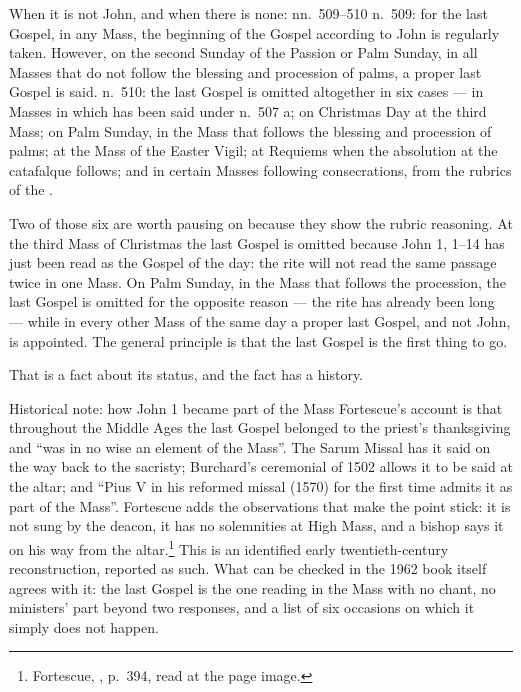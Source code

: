 \begin{rubricnote}{When it is not John, and when there is none: nn.~509--510}
n.~509: for the last Gospel, in any Mass, the beginning of the Gospel according
to John is regularly taken. However, on the second Sunday of the Passion or
Palm Sunday, in all Masses that do not follow the blessing and procession of
palms, a proper last Gospel is said. n.~510: the last Gospel is omitted
altogether in six cases --- in Masses in which 
has been said under n.~507 a; on Christmas Day at the third Mass; on Palm
Sunday, in the Mass that follows the blessing and procession of palms; at the
Mass of the Easter Vigil; at Requiems when the absolution at the catafalque
follows; and in certain Masses following consecrations, from the rubrics of the
.
\end{rubricnote}

Two of those six are worth pausing on because they show the rubric reasoning.
At the third Mass of Christmas the last Gospel is omitted because John 1,
1--14 has just been read as the Gospel of the day: the rite will not read the
same passage twice in one Mass. On Palm Sunday, in the Mass that follows the
procession, the last Gospel is omitted for the opposite reason --- the rite has
already been long --- while in every other Mass of the same day a proper last
Gospel, and not John, is appointed. The general principle is that the last
Gospel is the first thing to go.

That is a fact about its status, and the fact has a history.

\begin{witnesscard}{Historical note: how John 1 became part of the Mass}
Fortescue's account is that throughout the Middle Ages the last Gospel belonged
to the priest's thanksgiving and ``was in no wise an element of the Mass''. The
Sarum Missal has it said on the way back to the sacristy; Burchard's ceremonial
of 1502 allows it to be said at the altar; and ``Pius V in his reformed missal
(1570) for the first time admits it as part of the Mass''. Fortescue adds the
observations that make the point stick: it is not sung by the deacon, it has no
solemnities at High Mass, and a bishop says it on his way from the
altar.\footnote{Fortescue, , p.~394, read at the page image.}
This is an identified early twentieth-century reconstruction, reported as such.
What can be checked in the 1962 book itself agrees with it: the last Gospel is
the one reading in the Mass with no chant, no ministers' part beyond two
responses, and a list of six occasions on which it simply does not happen.
\end{witnesscard}

